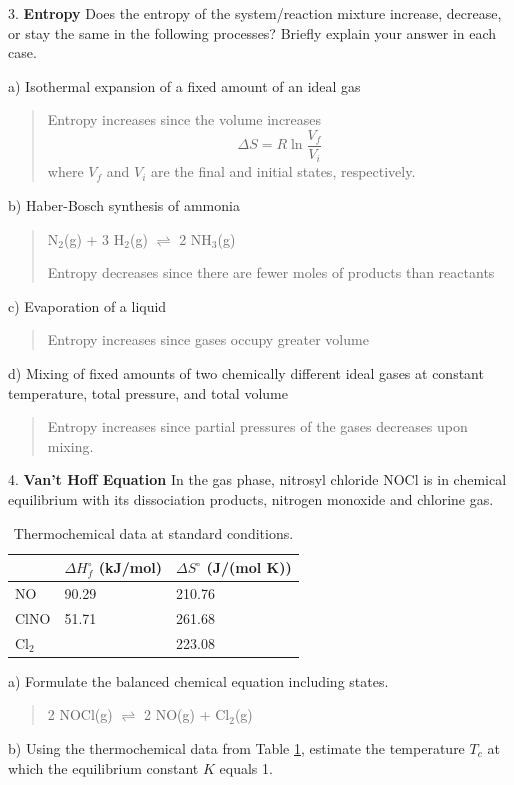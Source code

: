 \documentclass[11pt]{article}
\newcommand{\brian}[1]{
  {\begin{quote}
      \color{blue} #1
  \end{quote}}
}
\begin{document}
3. \textbf{Entropy} Does the entropy of the system/reaction mixture increase,
decrease, or stay the same in the following processes? Briefly explain your
answer in each case.

a) Isothermal expansion of a fixed amount of an ideal gas

\brian{Entropy increases since the volume increases
  \begin{equation*}
    \Delta S = R\ln\frac{V_f}{V_i}
  \end{equation*}
  where $V_f$ and $V_i$ are the final and initial states, respectively.
}

b) Haber-Bosch synthesis of ammonia

\brian{N$_2$(g) + 3 H$_2$(g) $\rightleftharpoons$ 2 NH$_3$(g)

  Entropy decreases since there are fewer moles of products than reactants
}

c) Evaporation of a liquid

\brian{Entropy increases since gases occupy greater volume}

d) Mixing of fixed amounts of two chemically different ideal gases at constant temperature, 
total pressure, and total volume

\brian{Entropy increases since partial pressures of the gases decreases upon mixing.}

4. \textbf{Van't Hoff Equation} In the gas phase, nitrosyl chloride NOCl is in chemical
equilibrium with its dissociation products, nitrogen monoxide and chlorine gas.

\begin{table}[hbpt]
  \centering
  \begin{tabular}{lll}
      & $\Delta H^\circ_f$ (kJ/mol) & $\Delta S^\circ$ (J/(mol K)) \\
      \hline
      NO     & 90.29 & 210.76 \\
      ClNO   & 51.71 & 261.68 \\
      Cl$_2$ &       & 223.08
  \end{tabular}
  \caption{Thermochemical data at standard conditions.}
  \label{tab:therm}
\end{table}

a) Formulate the balanced chemical equation including states.

\brian{2 NOCl(g) $\rightleftharpoons$ 2 NO(g) + Cl$_2$(g)}

b) Using the thermochemical data from Table \ref{tab:therm}, estimate the temperature $T_c$
at which the equilibrium constant $K$ equals 1.
\end{document}
